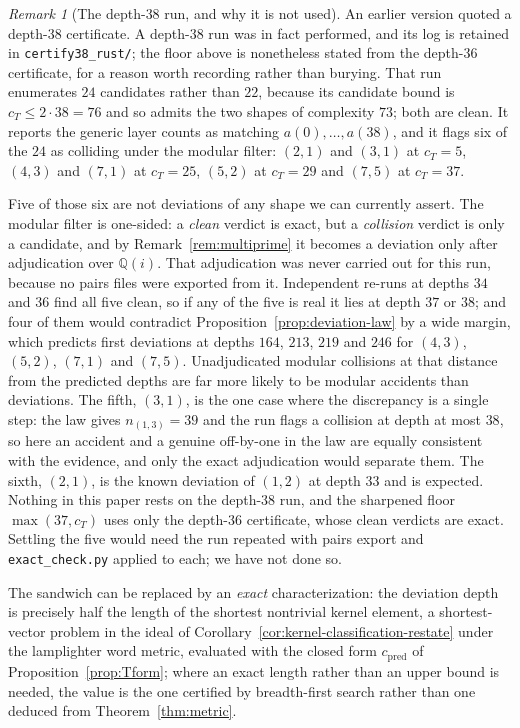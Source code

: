 \documentclass[11pt]{article}
\theoremstyle{plain}
\theoremstyle{definition}
\theoremstyle{remark}
\newtheorem{remark}[theorem]{Remark}
\newcommand{\Q}{\mathbb{Q}}
\begin{document}
\begin{remark}[The depth-$38$ run, and why it is not used]
\label{rem:depth38}
An earlier version quoted a depth-$38$ certificate. A depth-$38$ run was in fact
performed, and its log is retained in \texttt{certify38\_rust/}; the floor above
is nonetheless stated from the depth-$36$ certificate, for a reason worth
recording rather than burying. That run enumerates $24$ candidates rather than
$22$, because its candidate bound is $c_T\le 2\cdot 38=76$ and so admits the two
shapes of complexity $73$; both are clean. It reports the generic layer counts as
matching $a(0),\dots,a(38)$, and it flags six of the $24$ as colliding under the
modular filter: $(2,1)$ and $(3,1)$ at $c_T=5$, $(4,3)$ and $(7,1)$ at $c_T=25$,
$(5,2)$ at $c_T=29$ and $(7,5)$ at $c_T=37$.

Five of those six are not deviations of any shape we can currently assert. The
modular filter is one-sided: a \emph{clean} verdict is exact, but a
\emph{collision} verdict is only a candidate, and by
Remark~\textup{\ref{rem:multiprime}} it becomes a deviation only after
adjudication over $\Q(i)$. That adjudication was never carried out for this run,
because no pairs files were exported from it. Independent re-runs at depths $34$
and $36$ find all five clean, so if any of the five is real it lies at depth $37$
or $38$; and four of them would contradict
Proposition~\textup{\ref{prop:deviation-law}} by a wide margin, which predicts
first deviations at depths $164$, $213$, $219$ and $246$ for $(4,3)$, $(5,2)$,
$(7,1)$ and $(7,5)$. Unadjudicated modular collisions at that distance from the
predicted depths are far more likely to be modular accidents than deviations.
The fifth, $(3,1)$, is the one case where the discrepancy is a single step: the
law gives $n_{(1,3)}=39$ and the run flags a collision at depth at most $38$, so
here an accident and a genuine off-by-one in the law are equally consistent with
the evidence, and only the exact adjudication would separate them. The sixth,
$(2,1)$, is the known deviation of $(1,2)$ at depth $33$ and is expected.
Nothing in this paper rests on the depth-$38$ run, and the sharpened floor
$\max(37,c_T)$ uses only the depth-$36$ certificate, whose clean verdicts are
exact. Settling the five would need the run repeated with pairs export and
\texttt{exact\_check.py} applied to each; we have not done so.
\end{remark}

The sandwich can be replaced by an \emph{exact} characterization: the deviation
depth is precisely half the length of the shortest nontrivial kernel element,
a shortest-vector problem in the ideal of
Corollary~\ref{cor:kernel-classification-restate} under the lamplighter word
metric, evaluated with the closed form $c_{\mathrm{pred}}$ of
Proposition~\ref{prop:Tform}; where an exact length rather than an upper bound
is needed, the value is the one certified by breadth-first search rather than
one deduced from Theorem~\ref{thm:metric}.
\end{document}
